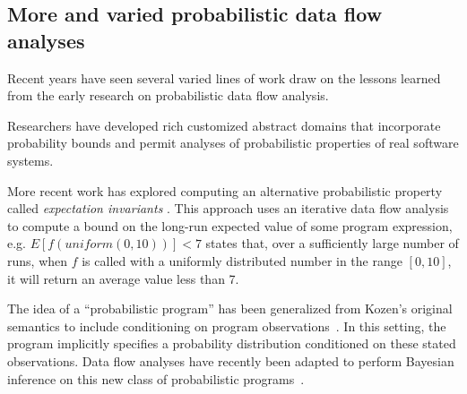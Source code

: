 \subsection{More and varied probabilistic data flow analyses}
Recent years have seen several varied lines of work draw on
the lessons learned from the early research on probabilistic
data flow analysis.

Researchers have developed rich customized abstract domains that 
incorporate probability bounds \cite{probabilisticPolyhedra,probAffineForms}
and permit analyses of probabilistic properties of real software systems.

More recent work has explored computing an alternative probabilistic
property called {\sl expectation invariants} \cite{chakarov2014expectation}.
This approach uses an iterative data flow analysis to 
compute a bound on the long-run expected value of
some program expression, e.g. $E[f(\mathit{uniform}(0,10))] < 7$ states that,
over a sufficiently large number of runs, when $f$ is called with
a uniformly distributed number in the range $[0,10]$, it will return
an average value less than 7.

The idea of a ``probabilistic program'' has been generalized from
Kozen's original semantics to include conditioning on program
observations~\cite{Gordon2014}.
In this setting, the program implicitly specifies a probability 
distribution conditioned on these stated observations.
Data flow analyses have recently been adapted to perform Bayesian
inference on this new class of probabilistic 
programs~\cite{claret2013bayesian}.  
